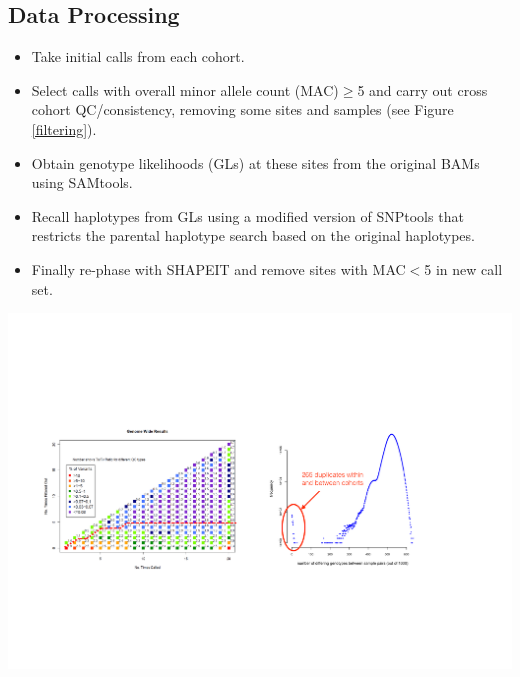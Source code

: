 \documentclass[a0,landscape]{a0poster}
\begin{document}
\begin{multicols}{3}
\vspace{-1.5cm}
\subsection*{Data Processing}

\begin{itemize}
\setlength{\itemsep}{1pt}
\renewcommand{\labelitemi}{$\rightarrow$} 
\item Take initial calls from each cohort.
\item Select calls with overall minor allele count (MAC)$\ge$5 and carry out cross cohort QC/consistency, removing some sites and samples (see Figure \ref{filtering}).
\item Obtain genotype likelihoods (GLs) at these sites from the original BAMs using SAMtools.
\item Recall haplotypes from GLs using a modified version of SNPtools \cite{wang2013integrative} that restricts the parental haplotype search based on the original haplotypes.
\item Finally re-phase with SHAPEIT and remove sites with MAC$<$5 in new call set.
\end{itemize}

\begin{center}\vspace{0.001cm}
\captionsetup{type=figure}
\includegraphics[width=0.7\linewidth]{images/filtering.pdf}
\label{filtering}
\end{center}\vspace{0.001cm}


\end{multicols}
\end{document}
